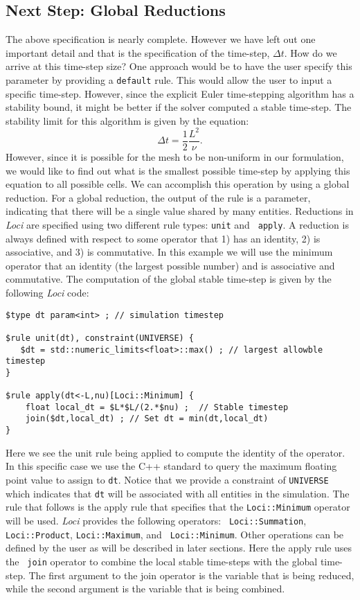 \documentclass[10pt,epsf]{book}
\begin{document}
\subsection{Next Step: Global Reductions}

The above specification is nearly complete.  However we have left out
one important detail and that is the specification of the time-step,
$\Delta t$.  How do we arrive at this time-step size?  One approach
would be to have the user specify this parameter by providing a
{\tt default} rule.  This would allow the user to input a specific
time-step.  However, since the explicit Euler time-stepping algorithm
has a stability bound, it might be better if the solver computed a
stable time-step.  The stability limit for this algorithm is given by
the equation:
\begin{equation}
\Delta t = \frac{1}{2}\frac{L^2}{\nu}.
\end{equation}
However, since it is possible for the mesh to be non-uniform in our
formulation, we would like to find out what is the smallest possible
time-step by applying this equation to all possible cells.  We can
accomplish this operation by using a global reduction.  For a global
reduction, the output of the rule is a parameter, indicating that
there will be a single value shared by many entities.  Reductions in
{\it Loci} are specified using two different rule types: {\tt unit} and {\tt
  apply}.  A reduction is always defined with respect to some operator
that 1) has an identity, 2) is associative, and 3) is commutative.
In this example we will use the minimum operator that an identity (the
largest possible number) and is associative and commutative.  The
computation of the global stable time-step is given by the following
{\it Loci} code:
\begin{verbatim}
$type dt param<int> ; // simulation timestep

$rule unit(dt), constraint(UNIVERSE) {
   $dt = std::numeric_limits<float>::max() ; // largest allowble timestep
}

$rule apply(dt<-L,nu)[Loci::Minimum] {
    float local_dt = $L*$L/(2.*$nu) ;  // Stable timestep
    join($dt,local_dt) ; // Set dt = min(dt,local_dt)
}
\end{verbatim}

Here we see the unit rule being applied to compute the identity of the
operator.  In this specific case we use the C++ standard to query the
maximum floating point value to assign to {\tt dt}. Notice that we
provide a constraint of {\tt UNIVERSE} which indicates that {\tt dt}
will be associated with all entities in the simulation.  The rule that
follows is the apply rule that specifies that the {\tt Loci::Minimum}
operator will be used.  {\it Loci} provides the following operators: {\tt
  Loci::Summation}, {\tt Loci::Product}, {\tt Loci::Maximum}, and {\tt
  Loci::Minimum}.  Other operations can be defined by the user as will
be described in later sections.  Here the apply rule uses the {\tt
  join} operator to combine the local stable time-steps with the
global time-step.  The first argument to the join operator is the
variable that is being reduced, while the second argument is the
variable that is being combined.  
\end{document}
